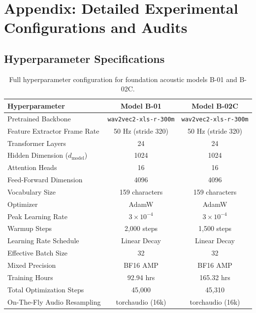 \section{Appendix: Detailed Experimental Configurations and Audits}

\subsection{Hyperparameter Specifications}
\begin{table}[ht]
\centering
\small
\caption{Full hyperparameter configuration for foundation acoustic models B-01 and B-02C.}
\label{tab:hyperparams}
\begin{tabular}{lcc}
\toprule
\textbf{Hyperparameter} & \textbf{Model B-01} & \textbf{Model B-02C} \\
\midrule
Pretrained Backbone & \texttt{wav2vec2-xls-r-300m} & \texttt{wav2vec2-xls-r-300m} \\
Feature Extractor Frame Rate & 50 Hz (stride 320) & 50 Hz (stride 320) \\
Transformer Layers & 24 & 24 \\
Hidden Dimension ($d_{\text{model}}$) & 1024 & 1024 \\
Attention Heads & 16 & 16 \\
Feed-Forward Dimension & 4096 & 4096 \\
Vocabulary Size & 159 characters & 159 characters \\
Optimizer & AdamW & AdamW \\
Peak Learning Rate & $3 \times 10^{-4}$ & $3 \times 10^{-4}$ \\
Warmup Steps & 2,000 steps & 1,500 steps \\
Learning Rate Schedule & Linear Decay & Linear Decay \\
Effective Batch Size & 32 & 32 \\
Mixed Precision & BF16 AMP & BF16 AMP \\
Training Hours & 92.94 hrs & 165.32 hrs \\
Total Optimization Steps & 45,000 & 45,310 \\
On-The-Fly Audio Resampling & torchaudio (16k) & torchaudio (16k) \\
\bottomrule
\end{tabular}
\end{table}

